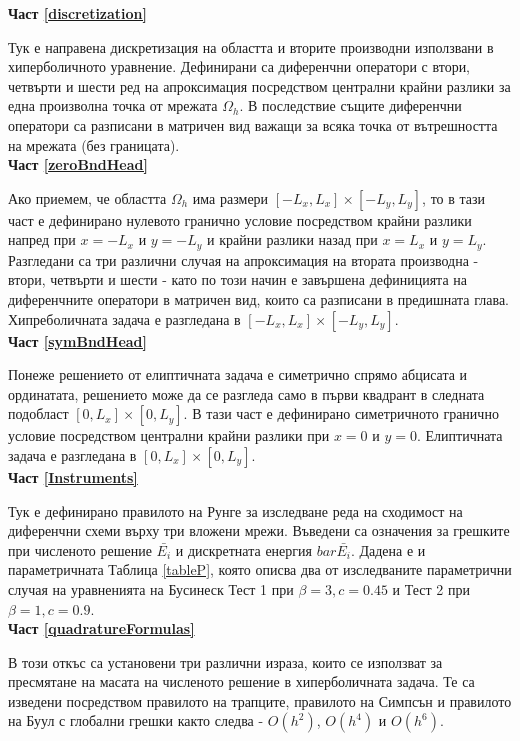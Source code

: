 \documentclass{article}
\theoremstyle{remark}
\begin{document}
\textbf{Част \ref{discretization}}

Тук е направена дискретизация на областта и вторите производни използвани в хиперболичното уравнение. Дефинирани са диференчни оператори с втори, четвърти и шести ред на апроксимация посредством централни крайни разлики за една произволна точка от мрежата $\Omega_h$. В последствие същите диференчни оператори са разписани в матричен вид важащи за всяка точка от вътрешността на мрежата (без границата). \\

\textbf{Част \ref{zeroBndHead}}

Ако приемем, че областта $\Omega_h$ има размери $[-L_x, L_x]\times[-L_y, L_y]$, то в тази част е дефинирано нулевото гранично условие посредством крайни разлики напред при $x=-L_x$ и $y=-L_y$ и крайни разлики назад при $x=L_x$ и $y=L_y$. Разгледани са три различни случая на апроксимация на втората производна - втори, четвърти и шести - като по този начин е завършена дефиницията на диференчните оператори в матричен вид, които са разписани в предишната глава. Хипреболичната задача е разгледана в $[-L_x, L_x]\times[-L_y, L_y]$. \\

\textbf{Част \ref{symBndHead}}

Понеже решението от елиптичната задача е симетрично спрямо абцисата и ординатата, решението може да се разгледа само в първи квадрант в следната подобласт $[0, L_x]\times[0, L_y]$. В тази част е дефинирано симетричното гранично условие посредством централни крайни разлики при $x=0$ и $y=0$. Елиптичната задача е разгледана в $[0, L_x]\times[0, L_y]$. \\


\textbf{Част \ref{Instruments}} 

Тук е дефинирано правилото на Рунге за изследване реда на сходимост на диференчни схеми върху три вложени мрежи. Въведени са означения за грешките при численото решение $\bar{ E_i}$ и дискретната енергия $bar{\bar{ E_i}}$. Дадена е и параметричната Таблица \ref{tableP}, която описва два от изследваните параметрични случая на уравненията на Бусинеск Тест 1 при $\beta = 3, c=0.45$ и Тест 2 при $\beta = 1, c=0.9$. \\

\textbf{Част \ref{quadratureFormulas}} 

В този откъс са установени три различни израза, които се използват за пресмятане на масата на численото решение в хиперболичната задача. Те са изведени посредством правилото на трапците, правилото на  Симпсън и правилото на Буул с глобални грешки както следва - $O(h^2)$, $O(h^4)$ и $O(h^6)$.
\end{document}
